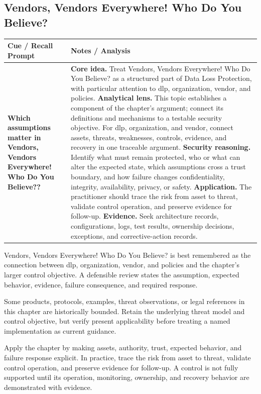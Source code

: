 \documentclass[11pt]{article}
\newcommand{\CornellHeader}{%
\rowcolor{Navy}\color{white}\bfseries Cue / Recall Prompt & \color{white}\bfseries Notes / Analysis\\\hline}
\newcommand{\CornellRow}[2]{%
\cellcolor{CueGray}\RaggedRight\textbf{#1} & \RaggedRight #2\\\hline}
\begin{document}
\subsection*{Vendors, Vendors Everywhere! Who Do You Believe?}
\begin{longtable}{>{\RaggedRight\arraybackslash}p{}|>{\RaggedRight\arraybackslash}p{}}
\CornellHeader
\CornellRow{Which assumptions matter in Vendors, Vendors Everywhere! Who Do You Believe??}{\textbf{Core idea.} Treat Vendors, Vendors Everywhere! Who Do You Believe? as a structured part of Data Loss Protection, with particular attention to dlp, organization, vendor, and policies. \textbf{Analytical lens.} This topic establishes a component of the chapter's argument; connect its definitions and mechanisms to a testable security objective. For dlp, organization, and vendor, connect assets, threats, weaknesses, controls, evidence, and recovery in one traceable argument. \textbf{Security reasoning.} Identify what must remain protected, who or what can alter the expected state, which assumptions cross a trust boundary, and how failure changes confidentiality, integrity, availability, privacy, or safety. \textbf{Application.} The practitioner should trace the risk from asset to threat, validate control operation, and preserve evidence for follow-up. \textbf{Evidence.} Seek architecture records, configurations, logs, test results, ownership decisions, exceptions, and corrective-action records.}
\end{longtable}
\begin{topicsummary}
Vendors, Vendors Everywhere! Who Do You Believe? is best remembered as the connection between dlp, organization, vendor, and policies and the chapter's larger control objective. A defensible review states the assumption, expected behavior, evidence, failure consequence, and required response.
\end{topicsummary}
\begin{historybox}
Some products, protocols, examples, threat observations, or legal references in this chapter are historically bounded. Retain the underlying threat model and control objective, but verify present applicability before treating a named implementation as current guidance.
\end{historybox}
\begin{defensebox}
Apply the chapter by making assets, authority, trust, expected behavior, and failure response explicit. In practice, trace the risk from asset to threat, validate control operation, and preserve evidence for follow-up. A control is not fully supported until its operation, monitoring, ownership, and recovery behavior are demonstrated with evidence.
\end{defensebox}
\end{document}
